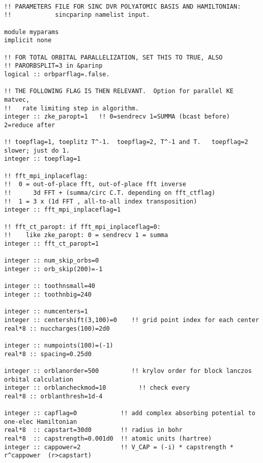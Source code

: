 \begin{verbatim}

!! PARAMETERS FILE FOR SINC DVR POLYATOMIC BASIS AND HAMILTONIAN:
!!            sincparinp namelist input.

module myparams
implicit none

!! FOR TOTAL ORBITAL PARALLELIZATION, SET THIS TO TRUE, ALSO
!! PARORBSPLIT=3 in &parinp
logical :: orbparflag=.false.

!! THE FOLLOWING FLAG IS THEN RELEVANT.  Option for parallel KE matvec,
!!   rate limiting step in algorithm.
integer :: zke_paropt=1   !! 0=sendrecv 1=SUMMA (bcast before) 2=reduce after

!! toepflag=1, toeplitz T^-1.  toepflag=2, T^-1 and T.   toepflag=2 slower; just do 1.
integer :: toepflag=1

!! fft_mpi_inplaceflag:
!!  0 = out-of-place fft, out-of-place fft inverse
!!      3d FFT + (summa/circ C.T. depending on fft_ctflag)
!!  1 = 3 x (1d FFT , all-to-all index transposition)
integer :: fft_mpi_inplaceflag=1    

!! fft_ct_paropt: if fft_mpi_inplaceflag=0:
!!    like zke_paropt: 0 = sendrecv 1 = summa
integer :: fft_ct_paropt=1

integer :: num_skip_orbs=0
integer :: orb_skip(200)=-1

integer :: toothnsmall=40
integer :: toothnbig=240

integer :: numcenters=1
integer :: centershift(3,100)=0    !! grid point index for each center
real*8 :: nuccharges(100)=2d0

integer :: numpoints(100)=(-1)
real*8 :: spacing=0.25d0

integer :: orblanorder=500         !! krylov order for block lanczos orbital calculation
integer :: orblancheckmod=10         !! check every
real*8 :: orblanthresh=1d-4

integer :: capflag=0            !! add complex absorbing potential to one-elec Hamiltonian
real*8  :: capstart=30d0        !! radius in bohr
real*8  :: capstrength=0.001d0  !! atomic units (hartree)
integer :: cappower=2           !! V_CAP = (-i) * capstrength * r^cappower  (r>capstart)

\end{verbatim}
